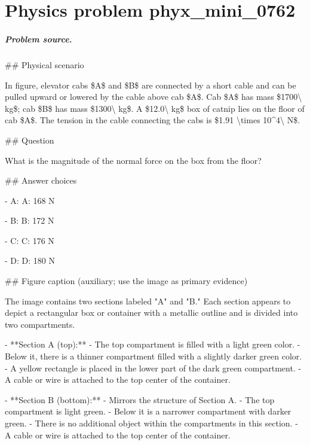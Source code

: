 
\chapter{Physics problem phyx\_mini\_0762}
\label{ch:PhyXMiniProblems_problem_phyx_mini_0762}

\paragraph{Problem source.}
\#\# Physical scenario

In figure, elevator cabs \$A\$ and \$B\$ are connected by a short cable and can be pulled upward or lowered by the cable above cab \$A\$. Cab \$A\$ has mass \$1700\textbackslash{} kg\$; cab \$B\$ has mass \$1300\textbackslash{} kg\$. A \$12.0\textbackslash{} kg\$ box of catnip lies on the floor of cab \$A\$. The tension in the cable connecting the cabs is \$1.91 \textbackslash{}times 10\textasciicircum{}4\textbackslash{} N\$.

\#\# Question

What is the magnitude of the normal force on the box from the floor?

\#\# Answer choices

- A: A: 168 N

- B: B: 172 N

- C: C: 176 N

- D: D: 180 N

\#\# Figure caption (auxiliary; use the image as primary evidence)

The image contains two sections labeled "A" and "B." Each section appears to depict a rectangular box or container with a metallic outline and is divided into two compartments. 

- **Section A (top):** 
  - The top compartment is filled with a light green color.
  - Below it, there is a thinner compartment filled with a slightly darker green color.
  - A yellow rectangle is placed in the lower part of the dark green compartment.
  - A cable or wire is attached to the top center of the container.

- **Section B (bottom):**
  - Mirrors the structure of Section A.
  - The top compartment is light green.
  - Below it is a narrower compartment with darker green.
  - There is no additional object within the compartments in this section.
  - A cable or wire is attached to the top center of the container.

